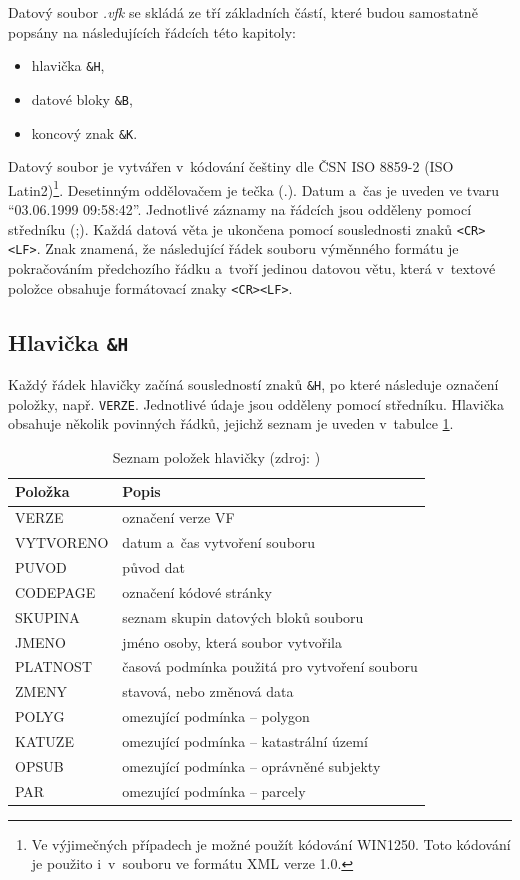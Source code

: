 \documentclass[a4paper,12pt,oneside]{book}
\begin{document}
Datový soubor \textit{.vfk} se skládá ze tří základních částí, které budou samostatně popsány na následujících řádcích této kapitoly:

\begin{itemize}
 \item hlavička \texttt{\&H},
 \item datové bloky \texttt{\&B},
 \item koncový znak \texttt{\&K}.
\end{itemize}

Datový soubor je vytvářen v~kódování češtiny dle ČSN ISO 8859-2 (ISO Latin2)\footnote{Ve výjimečných případech je možné použít kódování WIN1250. Toto kódování je použito i~v~souboru ve formátu XML verze 1.0.}. Desetinným oddělovačem je tečka (.). Datum a~čas je uveden ve tvaru ``03.06.1999 09:58:42''. Jednotlivé záznamy na řádcích jsou odděleny pomocí středníku (;). Každá datová věta je ukončena pomocí souslednosti znaků \texttt{<CR><LF>}. Znak \uv{\texttt{\currency}} znamená, že následující řádek souboru výměnného formátu je pokračováním předchozího řádku a~tvoří jedinou datovou větu, která v~textové položce obsahuje formátovací znaky \texttt{<CR><LF>}. \cite{vfk_struktura}

\subsection{Hlavička \texttt{\&H}}

Každý řádek hlavičky začíná sousledností znaků \texttt{\&H}, po které následuje označení položky, např. \texttt{VERZE}. Jednotlivé údaje jsou odděleny pomocí středníku. Hlavička obsahuje několik povinných řádků, jejichž seznam je uveden v~tabulce \ref{t_hlavicka}.

\begin{table}[htbp]
\centering
\caption[Seznam položek hlavičky]{Seznam položek hlavičky (zdroj: \cite{vfk_struktura})}
\begin{tabular}{ll}
\toprule
\textbf{Položka} & \textbf{Popis} \\ 
\midrule
VERZE & označení verze VF \\ 
VYTVORENO & datum a~čas vytvoření souboru \\ 
PUVOD & původ dat \\ 
CODEPAGE & označení kódové stránky \\ 
SKUPINA & seznam skupin datových bloků souboru \\ 
JMENO & jméno osoby, která soubor vytvořila \\ 
PLATNOST & časová podmínka použitá pro vytvoření souboru \\ 
ZMENY & stavová, nebo změnová data \\ 
POLYG & omezující podmínka -- polygon \\
KATUZE & omezující podmínka -- katastrální území \\
OPSUB & omezující podmínka -- oprávněné subjekty \\
PAR & omezující podmínka -- parcely \\
\bottomrule
\end{tabular}
\label{t_hlavicka}
\end{table}
\end{document}
